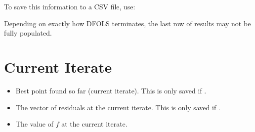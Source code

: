 \documentclass[letterpaper,10pt,english]{sphinxmanual}
\begin{document}
To save this information to a CSV file, use:
\begin{quote}

\begin{sphinxVerbatim}[commandchars=\\\{\}]

   

    

\end{sphinxVerbatim}
\end{quote}

Depending on exactly how DFO\sphinxhyphen{}LS terminates, the last row of results may not be fully populated.


\section{Current Iterate}
\label{\detokenize{diagnostic:current-iterate}}\begin{itemize}
\item {} 
 \sphinxhyphen{} Best point found so far (current iterate). This is only saved if .

\item {} 
 \sphinxhyphen{} The vector of residuals at the current iterate. This is only saved if .

\item {} 
 \sphinxhyphen{} The value of \(f\) at the current iterate.

\end{itemize}
\end{document}
